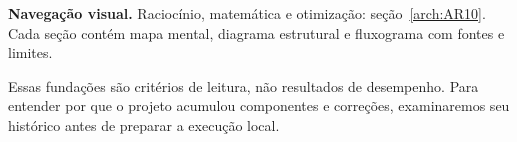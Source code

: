 
\begin{descricao}\textbf{Navegação visual.} Raciocínio, matemática e otimização: seção~\ref{arch:AR10}. Cada seção contém mapa mental, diagrama estrutural e fluxograma com fontes e limites.\end{descricao}


Essas fundações são critérios de leitura, não resultados de desempenho. Para entender por que o projeto acumulou componentes e correções, examinaremos seu histórico antes de preparar a execução local.
